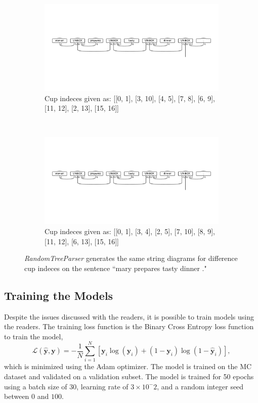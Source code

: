 \documentclass[12pt ]{article}
\def\y{\mathbf{y}}
\def\yh{\hat{\mathbf{y}}}
\begin{document}
\begin{figure}[t!]
    \centering
    \begin{subfigure}[t]{0.5\textwidth}
        \centering
        \includegraphics[width=\textwidth]{../test/output/randomParser_0.pdf}
        \caption{Cup indeces given as: [[0, 1], [3, 10], [4, 5], [7, 8], [6, 9], [11, 12], [2, 13], [15, 16]]}

    \end{subfigure}%
    ~ 
    \begin{subfigure}[t]{0.5\textwidth}
        \centering
        \includegraphics[width=\textwidth]{../test/output/randomParser_1.pdf}
        \caption{Cup indeces given as: [[0, 1], [3, 4], [2, 5], [7, 10], [8, 9], [11, 12], [6, 13], [15, 16]]}

    \end{subfigure}
    \caption{{\it RandomTreeParser} generates the same string diagrams for difference cup indeces on the sentence ``mary prepares tasty dinner ."}
    \label{fig:randomtreeparser}
\end{figure}

\subsection{Training the Models}
Despite the issues discussed with the readers, it is possible to train models using the readers. The training loss function is the Binary Cross Entropy loss function to train the model,
\begin{equation}
  \mathcal{L}(\yh, \y) = -\frac{1}{N}\sum_{i=1}^N \left[ \y_i \log(\yh_i) + (1-\y_i)\log(1-\yh_i) \right],
\end{equation}
which is minimized using the Adam optimizer. The model is trained on the MC dataset and validated on a validation subset. The model is trained for 50 epochs using a batch size of 30, learning rate of $3\times 10^-2$, and a random integer seed between $0$ and $100$.
\end{document}
